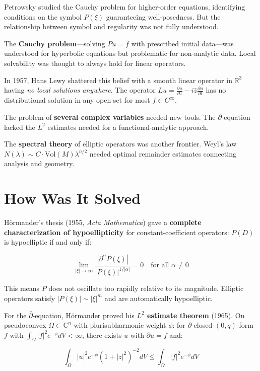 Petrowsky studied the Cauchy problem for higher-order equations, identifying
conditions on the symbol $P(\xi)$ guaranteeing well-posedness. But the
relationship between symbol and regularity was not fully understood.

The \textbf{Cauchy problem}---solving $Pu = f$ with prescribed initial data---was
understood for hyperbolic equations but problematic for non-analytic data. Local
solvability was thought to always hold for linear operators.

In 1957, Hans Lewy shattered this belief with a smooth linear operator in
$\mathbb{R}^3$ having \emph{no local solutions anywhere}. The operator
$Lu = \frac{\partial u}{\partial \bar{z}} - i\bar{z}\frac{\partial u}{\partial t}$
has no distributional solution in any open set for most $f \in C^\infty$.

The problem of \textbf{several complex variables} needed new tools. The
$\bar{\partial}$-equation lacked the $L^2$ estimates needed for a
functional-analytic approach.

The \textbf{spectral theory} of elliptic operators was another frontier. Weyl's
law $N(\lambda) \sim C \cdot \text{Vol}(M) \lambda^{n/2}$ needed optimal remainder
estimates connecting analysis and geometry.

\section{How Was It Solved}

Hörmander's thesis \cite{hormander1963} (1955, \emph{Acta Mathematica}) gave a \textbf{complete
characterization of hypoellipticity} for constant-coefficient operators:
$P(D)$ is hypoelliptic if and only if:

\[\lim_{|\xi| \to \infty} \frac{|\partial^\alpha P(\xi)|}{|P(\xi)|^{1/|\alpha|}} = 0
\quad \text{for all } \alpha \neq 0\]

This means $P$ does not oscillate too rapidly relative to its magnitude. Elliptic
operators satisfy $|P(\xi)| \sim |\xi|^m$ and are automatically hypoelliptic.

For the $\bar{\partial}$-equation, Hörmander proved his \textbf{$L^2$ estimate
theorem} (1965). On pseudoconvex $\Omega \subset \mathbb{C}^n$ with plurisubharmonic
weight $\phi$: for $\bar{\partial}$-closed $(0,q)$-form $f$ with
$\int_\Omega |f|^2 e^{-\phi} dV < \infty$, there exists $u$ with $\bar{\partial}u = f$
and:

\[\int_\Omega |u|^2 e^{-\phi}(1+|z|^2)^{-2} dV \leq \int_\Omega |f|^2 e^{-\phi} dV\]

